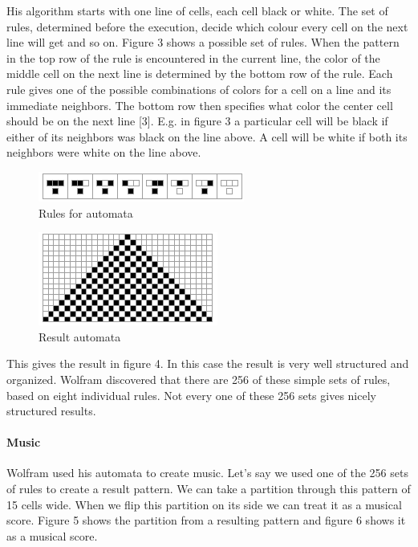 \documentclass[12pt]{article}
\begin{document}
His algorithm starts with one line of cells, each cell black or white. The set of rules, determined before the execution, decide which colour every cell on the next line will get and so on. Figure 3 shows a possible set of rules. When the pattern in the top row of the rule is encountered in the current line, the color of the middle cell on the next line is determined by the bottom row of the rule. Each rule gives one of the possible combinations of colors for a cell on a line and its immediate neighbors. The bottom row then specifies what color the center cell should be on the next line [3]. E.g. in figure 3 a particular cell will be black if either of its neighbors was black on the line above. A cell will be white if both its neighbors were white on the line above.

\begin{figure}[h]
\centering
\includegraphics[]{img/wolframRules}
\caption{Rules for automata}
\end{figure}

\begin{figure}[h]
\centering
\includegraphics[]{img/wolframResult-15}
\caption{Result automata}
\end{figure}

This gives the result in figure 4. In this case the result is very well structured and organized. Wolfram discovered that there are 256 of these simple sets of rules, based on eight individual rules. Not every one of these 256 sets gives nicely structured results.

\paragraph{Music}

Wolfram used his automata to create music. Let's say we used one of the 256 sets of rules to create a result pattern. We can take a partition through this pattern of 15 cells wide. When we flip this partition on its side we can treat it as a musical score.
Figure 5 shows the partition from a resulting pattern and figure 6 shows it as a musical score.
\newline
\end{document}
